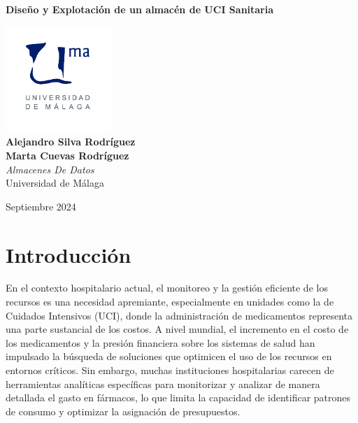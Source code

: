 \documentclass{article}
\begin{document}
\begin{titlepage}
	\centering
	\vspace*{3cm}
	
	{\Huge \textbf{Diseño y Explotación de un almacén de 
			UCI Sanitaria}\\[0.5cm]}
	
	\vspace{2cm}
	\includegraphics[width=0.3\textwidth]{images/uma_logo.jpg}\\[1cm]
	
	{\LARGE \textbf{Alejandro Silva Rodríguez}\\[0.5cm]}
	{\LARGE \textbf{Marta Cuevas Rodríguez}\\[0.5cm]}
	{\large \textit{Almacenes De Datos}\\
		Universidad de Málaga\\
		}
	
	\vfill
	
	{\large Septiembre 2024}
\end{titlepage}

\tableofcontents

\newpage
\section{Introducción}
\label{sec:introduccion}

En el contexto hospitalario actual, el monitoreo y la gestión eficiente de los recursos es una necesidad apremiante, especialmente en unidades como la de Cuidados Intensivos (UCI), donde la administración de medicamentos representa una parte sustancial de los costos. A nivel mundial, el incremento en el costo de los medicamentos y la presión financiera sobre los sistemas de salud han impulsado la búsqueda de soluciones que optimicen el uso de los recursos en entornos críticos. Sin embargo, muchas instituciones hospitalarias carecen de herramientas analíticas específicas para monitorizar y analizar de manera detallada el gasto en fármacos, lo que limita la capacidad de identificar patrones de consumo y optimizar la asignación de presupuestos.\\
\end{document}
